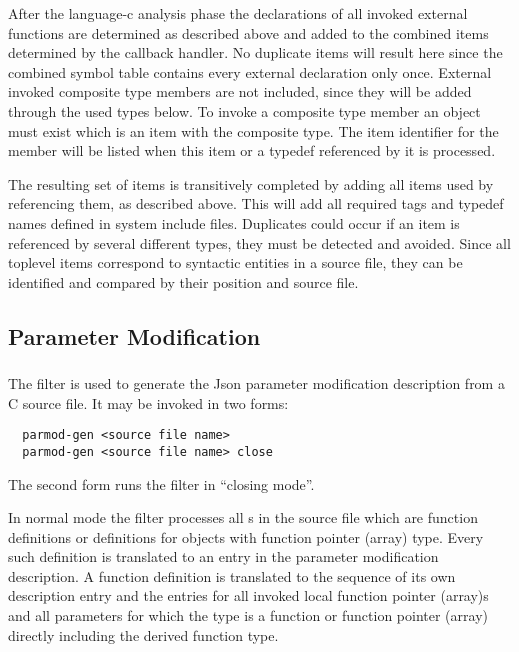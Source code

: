 After the language-c analysis phase the declarations of all invoked external functions are determined 
as described above and added to the combined items determined by the callback handler. No duplicate items
will result here since the combined symbol table contains every external declaration only once.
External invoked composite type members are not included, since they will be added through the used types below. To invoke 
a composite type member an object must exist which is an item with the composite type. The item
identifier for the member will be listed when this item or a typedef referenced by it
is processed.

The resulting set of items is transitively completed by adding all items used by referencing them,
as described above. This will add all required tags and typedef names defined in system include files.
Duplicates could occur if an item is referenced
by several different types, they must be detected and avoided. Since all toplevel items correspond to 
syntactic entities in a source file, they can be identified and compared by their position and source file.

\subsection{Parameter Modification}
\label{impl-ccomps-parmod}

\subsubsection{}

The filter  is used to generate the Json parameter modification description from a C source file.
It may be invoked in two forms:
\begin{verbatim}
  parmod-gen <source file name>
  parmod-gen <source file name> close
\end{verbatim}
The second form runs the filter in ``closing mode''.

In normal mode the filter processes all s in the source file which are function
definitions or definitions for objects with function pointer (array) type. Every such definition is translated to an
entry in the parameter modification description. A function definition is translated to the sequence of its
own description entry and the entries for all invoked local function pointer (array)s and all parameters for which
the type is a function or function pointer (array) directly including the derived function type.

